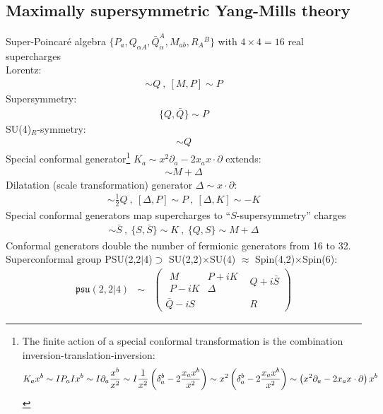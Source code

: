 \documentclass[12pt]{article}
\begin{document}
\subsection{Maximally supersymmetric Yang-Mills theory}

Super-Poincar\'e algebra $\{P_a, Q_{\alpha A}, \bar Q_{\dot \alpha }^A, M_{ab}, R_A{}^B\}$ with $4\times 4=16$ real supercharges\\
Lorentz:
\begin{eqnarray}
[M , Q]\sim Q ~,~ [M, P]\sim P
\end{eqnarray}
Supersymmetry:
\begin{eqnarray}
\{Q, \bar Q\} \sim P 
\end{eqnarray}
SU(4)$_R$-symmetry:
\begin{eqnarray}
[R, Q]\sim Q 
\end{eqnarray}
Special conformal generator\footnote{The finite action of a special conformal transformation is the combination inversion-translation-inversion:
\begin{eqnarray}
K_a x^b
\sim I P_a I x^b 
\sim I \partial_a {x^b \over x^2}
\sim I {1\over x^2}\left(\delta_a^b -2 {x_a x^b\over x^2}\right) 
\sim x^2\left(\delta_a^b -2 {x_a x^b\over x^2}\right) 
\sim \left(x^2\partial_a -2 x_a x\cdot\partial\right) x^b
\end{eqnarray}
} $K_a\sim x^2 \partial_a - 2x_a x\cdot \partial$ extends:
\begin{eqnarray}
[K, P]\sim M+\Delta
\end{eqnarray}
Dilatation (scale transformation) generator $\Delta \sim x\cdot \partial$:
\begin{eqnarray}
[\Delta , Q]\sim \frac 12 Q ~,~ [\Delta, P]\sim P~,~ [\Delta, K]\sim -K
\end{eqnarray}
Special conformal generators map supercharges to ``$S$-supersymmetry'' charges
\begin{eqnarray}
[K , Q]\sim \bar S ~,~ \{S,\bar S\}\sim K~,~ \{Q, S\} \sim M+\Delta
\end{eqnarray}
Conformal generators double the number of fermionic generators from 16 to 32.\\
Superconformal group PSU(2,2$|$4)$\supset$ SU(2,2)$\times$SU(4) $\approx$ Spin(4,2)$\times$Spin(6):
\begin{eqnarray}
\mathfrak{psu}(2,2|4) &\sim&
\left(\begin{array}{cc}
\begin{array}{cc}
M & P+iK\\
P-iK & \Delta
\end{array}
&Q+i \bar S\\
\bar Q-i S & R
\end{array}\right)
\end{eqnarray}
\end{document}
